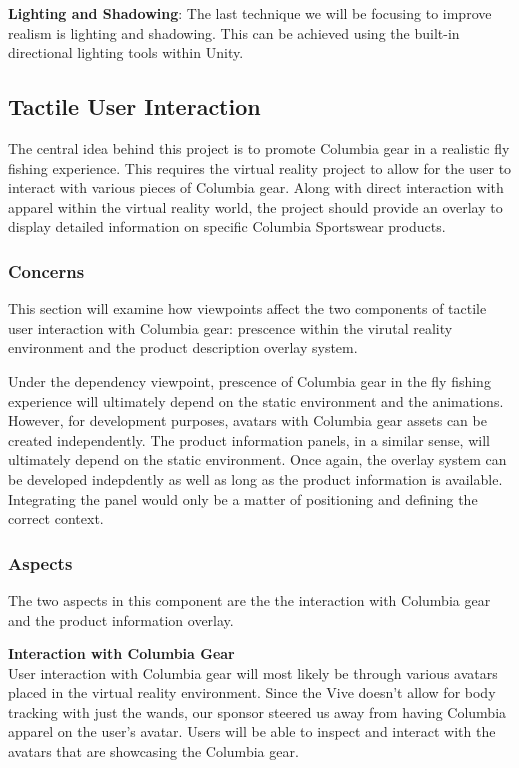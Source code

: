 \documentclass[10pt,journal,compsoc,onecolumn, draftclsnofoot]{IEEEtran}
\begin{document}
\hangindent=0.5cm \textbf{Lighting and Shadowing}: The last technique we will be focusing to improve realism is lighting and shadowing. This can be achieved using the built-in directional lighting tools within Unity. \\

\subsection{Tactile User Interaction}
The central idea behind this project is to promote Columbia gear in a realistic fly fishing experience. This requires the virtual reality project to allow for the user to interact with various pieces of Columbia gear. Along with direct interaction with apparel within the virtual reality world, the project should provide an overlay to display detailed information on specific Columbia Sportswear products.

\subsubsection{Concerns}

This section will examine how viewpoints affect the two components of tactile user interaction with Columbia gear: prescence within the virutal reality environment and the product description overlay system.

Under the dependency viewpoint, prescence of Columbia gear in the fly fishing experience will ultimately depend on the static environment and the animations. However, for development purposes, avatars with Columbia gear assets can be created independently. The product information panels, in a similar sense, will ultimately depend on the static environment. Once again, the overlay system can be developed indepdently as well as long as the product information is available. Integrating the panel would only be a matter of positioning and defining the correct context.

\subsubsection{Aspects}

The two aspects in this component are the the interaction with Columbia gear and the product information overlay.

\hangindent=0.5cm \textbf{Interaction with Columbia Gear} \\

User interaction with Columbia gear will most likely be through various avatars placed in the virtual reality environment. Since the Vive doesn't allow for body tracking with just the wands, our sponsor steered us away from having Columbia apparel on the user's avatar. Users will be able to inspect and interact with the avatars that are showcasing the Columbia gear.
\end{document}
